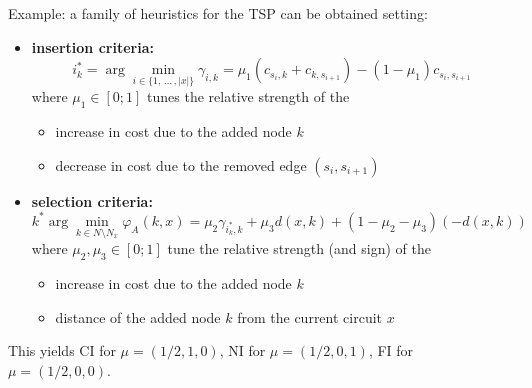 \documentclass[11pt]{article}
\begin{document}
	Example: a family of heuristics for the TSP can be obtained setting:
	\begin{itemize}
		\item \textbf{insertion criteria:}
		$$ i^\ast_k = \arg \min_{i \in \{1, \, ... \, , |x|\}} \gamma_{i,k} = \mu_1 (c_{s_i, k} + c_{k, s_{i+1}}) - (1 - \mu_1)c_{s_i, s_{i+1}} $$
		where $\mu_1 \in [0; 1]$ tunes the relative strength of the
		\begin{itemize}
			\item increase in cost due to the added node $k$
			\item decrease in cost due to the removed edge $(s_i , s_{i+1})$
		\end{itemize}
		
		\item \textbf{selection criteria:}
		$$ k^\ast \arg \min_{k \in N \setminus N_x} \varphi_A (k,x) = \mu_2 \gamma_{i_k^\ast, k} + \mu_3 d(x,k) + (1 - \mu_2 - \mu_3) (-d (x,k)) $$
		where $\mu_2, \mu_3 \in [0; 1]$ tune the relative strength (and sign) of the
		\begin{itemize}
			\item increase in cost due to the added node $k$
			\item distance of the added node $k$ from the current circuit $x$
		\end{itemize}
	\end{itemize}
	
	This yields CI for $\mu = (1/2, 1, 0)$, NI for $\mu = (1/2, 0, 1)$, FI for $\mu = (1/2, 0, 0)$.\\
	
	\newpage
	
\end{document}
